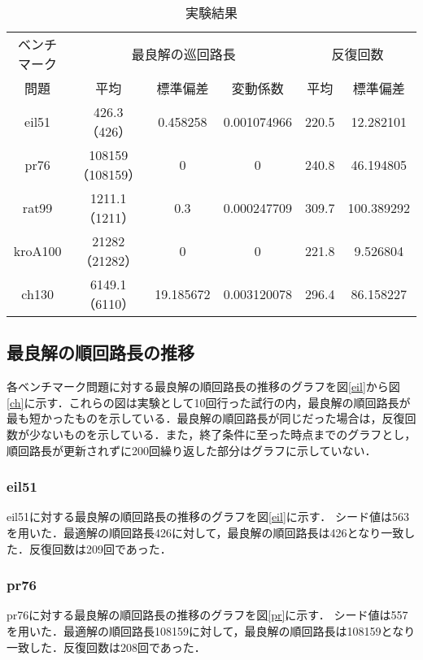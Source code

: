 \documentclass[a4j]{jsarticle}
\begin{document}
\begin{table}[H]
\begin{center}
 \caption{実験結果}
 \label{result}
 \begin{tabular}[tb]{|c||c|c|c||c|c|}\hline
  ベンチマーク& \multicolumn{3}{|c||}{最良解の巡回路長} & \multicolumn{2}{|c|}{反復回数}  \\ \cline{2-6}
  問題& 平均 & 標準偏差 & 変動係数 & 平均 & 標準偏差 \\\hline 
  eil51 & 426.3（426） & 0.458258 & 0.001074966 & 220.5 & 12.282101 \\\hline
  pr76 & 108159（108159） & 0 & 0 & 240.8 & 46.194805 \\\hline
  rat99 & 1211.1（1211） & 0.3 & 0.000247709 & 309.7 & 100.389292 \\\hline
  kroA100 & 21282（21282） & 0 & 0 & 221.8 & 9.526804 \\\hline
  ch130 & 6149.1（6110） & 19.185672 & 0.003120078 & 296.4 & 86.158227 \\\hline
 \end{tabular}
\end{center} 
\end{table}

\subsection{最良解の順回路長の推移}
各ベンチマーク問題に対する最良解の順回路長の推移のグラフを図\ref{eil}から図\ref{ch}に示す．これらの図は実験として10回行った試行の内，最良解の順回路長が最も短かったものを示している．最良解の順回路長が同じだった場合は，反復回数が少ないものを示している．また，終了条件に至った時点までのグラフとし，順回路長が更新されずに200回繰り返した部分はグラフに示していない．

\subsubsection{eil51}
eil51に対する最良解の順回路長の推移のグラフを図\ref{eil}に示す．
シード値は563を用いた．最適解の順回路長426に対して，最良解の順回路長は426となり一致した．反復回数は209回であった．

\subsubsection{pr76}
pr76に対する最良解の順回路長の推移のグラフを図\ref{pr}に示す．
シード値は557を用いた．最適解の順回路長108159に対して，最良解の順回路長は108159となり一致した．反復回数は208回であった．
\end{document}
